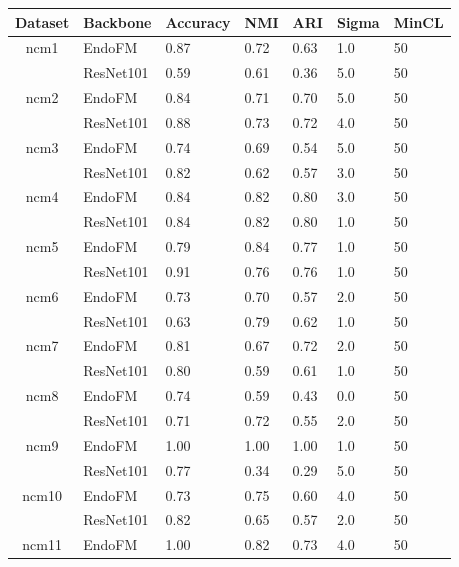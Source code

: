 \begin{table}[h]
\small
\setlength\tabcolsep{3pt}
    \centering
    \vspace{-0.05in}
    \begin{tabular}{cllllll}
    \toprule
        Dataset & Backbone & Accuracy & NMI & ARI & Sigma & MinCL \\
        \midrule
    \multirow{2}{*}{ncm1}
 & EndoFM & 0.87 & 0.72 & 0.63 & 1.0 & 50 \\
     & ResNet101 & 0.59 & 0.61 & 0.36 & 5.0 & 50 \\
    \midrule
    \multirow{2}{*}{ncm2}
 & EndoFM & 0.84 & 0.71 & 0.70 & 5.0 & 50 \\
     & ResNet101 & 0.88 & 0.73 & 0.72 & 4.0 & 50 \\
    \midrule
    \multirow{2}{*}{ncm3}
 & EndoFM & 0.74 & 0.69 & 0.54 & 5.0 & 50 \\
     & ResNet101 & 0.82 & 0.62 & 0.57 & 3.0 & 50 \\
    \midrule
    \multirow{2}{*}{ncm4}
 & EndoFM & 0.84 & 0.82 & 0.80 & 3.0 & 50 \\
     & ResNet101 & 0.84 & 0.82 & 0.80 & 1.0 & 50 \\
    \midrule
    \multirow{2}{*}{ncm5}
 & EndoFM & 0.79 & 0.84 & 0.77 & 1.0 & 50 \\
     & ResNet101 & 0.91 & 0.76 & 0.76 & 1.0 & 50 \\
    \midrule
    \multirow{2}{*}{ncm6}
 & EndoFM & 0.73 & 0.70 & 0.57 & 2.0 & 50 \\
     & ResNet101 & 0.63 & 0.79 & 0.62 & 1.0 & 50 \\
    \midrule
    \multirow{2}{*}{ncm7}
 & EndoFM & 0.81 & 0.67 & 0.72 & 2.0 & 50 \\
     & ResNet101 & 0.80 & 0.59 & 0.61 & 1.0 & 50 \\
    \midrule
    \multirow{2}{*}{ncm8}
 & EndoFM & 0.74 & 0.59 & 0.43 & 0.0 & 50 \\
     & ResNet101 & 0.71 & 0.72 & 0.55 & 2.0 & 50 \\
    \midrule
    \multirow{2}{*}{ncm9}
 & EndoFM & 1.00 & 1.00 & 1.00 & 1.0 & 50 \\
     & ResNet101 & 0.77 & 0.34 & 0.29 & 5.0 & 50 \\
    \midrule
    \multirow{2}{*}{ncm10}
 & EndoFM & 0.73 & 0.75 & 0.60 & 4.0 & 50 \\
     & ResNet101 & 0.82 & 0.65 & 0.57 & 2.0 & 50 \\
    \midrule
    \multirow{2}{*}{ncm11}
 & EndoFM & 1.00 & 0.82 & 0.73 & 4.0 & 50 \\

\end{tabular}
\end{table}
